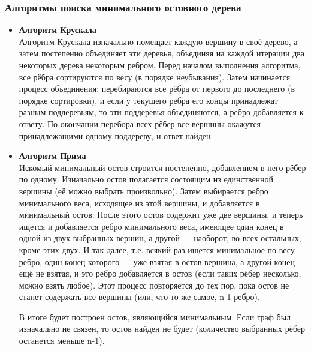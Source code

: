 \subsubsection{Алгоритмы поиска минимального остовного дерева}
\begin{itemize}
	\item \textbf{Алгоритм Крускала}\\
	Алгоритм Крускала изначально помещает каждую вершину в своё дерево, а затем постепенно объединяет эти деревья, объединяя на каждой итерации два некоторых дерева некоторым ребром. Перед началом выполнения алгоритма, все рёбра сортируются по весу (в порядке неубывания). Затем начинается процесс объединения: перебираются все рёбра от первого до последнего (в порядке сортировки), и если у текущего ребра его концы принадлежат разным поддеревьям, то эти поддеревья объединяются, а ребро добавляется к ответу. По окончании перебора всех рёбер все вершины окажутся принадлежащими одному поддереву, и ответ найден.\\
	\item \textbf{Алгоритм Прима}\\
	Искомый минимальный остов строится постепенно, добавлением в него рёбер по одному. Изначально остов полагается состоящим из единственной вершины (её можно выбрать произвольно). Затем выбирается ребро минимального веса, исходящее из этой вершины, и добавляется в минимальный остов. После этого остов содержит уже две вершины, и теперь ищется и добавляется ребро минимального веса, имеющее один конец в одной из двух выбранных вершин, а другой — наоборот, во всех остальных, кроме этих двух. И так далее, т.е. всякий раз ищется минимальное по весу ребро, один конец которого — уже взятая в остов вершина, а другой конец — ещё не взятая, и это ребро добавляется в остов (если таких рёбер несколько, можно взять любое). Этот процесс повторяется до тех пор, пока остов не станет содержать все вершины (или, что то же самое, n-1 ребро).
	
	В итоге будет построен остов, являющийся минимальным. Если граф был изначально не связен, то остов найден не будет (количество выбранных рёбер останется меньше n-1).
\end{itemize}


